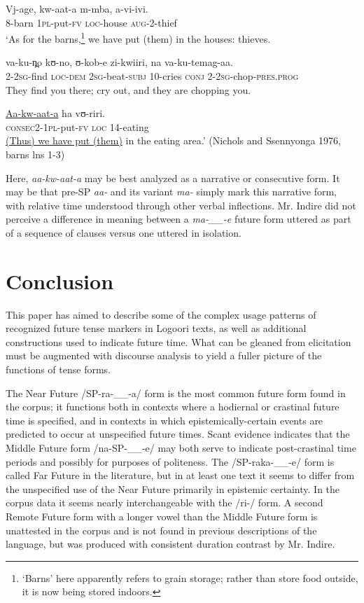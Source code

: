 \documentclass[output=paper]{langsci/langscibook}
\begin{document}
\ea\label{ex:sarvasy:30}
\gll Vj-age,     kw-aat-a   m-mba,   a-vi-ivi.\\
8-barn    \textsc{1pl}{}-put-\textsc{fv}  \textsc{loc}{}-house  \textsc{aug}{}-2-thief \\
\glt ‘As for the barns,\footnote{ ‘Barns’ here apparently refers to grain storage; rather than store food outside, it is now being stored indoors.} we have put (them) in the houses: thieves.

\gll va-ku-n̪o   kʊ{}-no,   ʊ{}-kob-e     zi-kwiiri,   na   va-ku-temag-aa. \\
2-\textsc{2sg}{}-find  \textsc{loc}{}-\textsc{dem}  \textsc{2sg}{}-beat-\textsc{subj}  10-cries  \textsc{conj}  2-\textsc{2sg}{}-chop-\textsc{pres}.\textsc{prog} \\
\glt They find you there; cry out, and they are chopping you. 

\gll \underline{Aa-kw-aat-a}     ha   vʊ-riri. \\
\textsc{consec2}{}-\textsc{1pl}{}-put-\textsc{fv}  \textsc{loc}  14-eating \\
\glt \underline{(Thus) we have put (them)} in the eating area.’ (Nichols and Ssennyonga 1976, barns lns 1-3)
\z

Here, \textit{aa-kw-aat-a }may be best analyzed as a narrative %
%
or consecutive form. It may be that pre-SP \textit{aa- }and its variant \textit{ma- }simply mark this narrative form, with relative time understood through other verbal inflections. Mr. Indire did not perceive a difference in meaning between a \textit{ma-\_\_-e }future form uttered as part of a sequence of clauses versus one uttered in isolation.

\section[Conclusion]{Conclusion} \label{sec:sarvasy:8}

This paper has aimed to describe some of the complex usage patterns of recognized future tense markers in Logoori texts, as well as additional constructions used to indicate future time. What can be gleaned from elicitation must be augmented with discourse analysis to yield a fuller picture of the functions of tense forms. 

The Near Future /SP-ra-\_\_-a/ form is the most common future form found in the corpus; it functions both in contexts where a hodiernal or crastinal future time is specified, and in contexts in which epistemically-certain events are predicted to occur at unspecified future times. Scant evidence indicates that the Middle Future form /na-SP-\_\_-e/ may both serve to indicate post-crastinal time periods and possibly for purposes of politeness. The /SP-raka-\_\_-e/ form is called Far Future in the literature, but in at least one text it seems to differ from the unspecified use of the Near Future primarily in epistemic certainty. In the corpus data it seems nearly interchangeable with the /ri-/ form. A second Remote Future form with a longer vowel than the Middle Future form is unattested in the corpus and is not found in previous descriptions of the language, but was produced with consistent duration contrast by Mr. Indire. 
\end{document}
